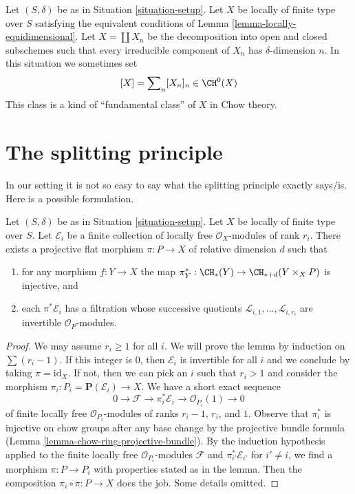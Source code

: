 \begin{remark}
\label{remark-fundamental-class}
Let $(S, \delta)$ be as in Situation \ref{situation-setup}.
Let $X$ be locally of finite type over $S$ satisfying the
equivalent conditions of Lemma \ref{lemma-locally-equidimensional}.
Let $X = \coprod X_n$ be the decomposition into open and closed
subschemes such that every irreducible component of $X_n$ has
$\delta$-dimension $n$. In this situation we sometimes set
$$
[X] = \sum\nolimits_n [X_n]_n \in \CH^0(X)
$$
This class is a kind of ``fundamental class'' of $X$ in Chow theory.
\end{remark}




\section{The splitting principle}
\label{section-splitting-principle}

\noindent
In our setting it is not so easy to say what the splitting principle
exactly says/is. Here is a possible formulation.

\begin{lemma}
\label{lemma-splitting-principle}
Let $(S, \delta)$ be as in Situation \ref{situation-setup}. Let $X$ be locally
of finite type over $S$. Let $\mathcal{E}_i$ be a finite collection of
locally free $\mathcal{O}_X$-modules of rank $r_i$. There exists a projective
flat morphism $\pi : P \to X$ of relative dimension $d$ such that
\begin{enumerate}
\item for any morphism $f : Y \to X$ the map
$\pi_Y^* : \CH_*(Y) \to \CH_{* + d}(Y \times_X P)$ is injective, and
\item each $\pi^*\mathcal{E}_i$ has a filtration
whose successive quotients $\mathcal{L}_{i, 1}, \ldots, \mathcal{L}_{i, r_i}$
are invertible ${\mathcal O}_P$-modules.
\end{enumerate}
\end{lemma}

\begin{proof}
We may assume $r_i \geq 1$ for all $i$. We will prove the lemma by induction
on $\sum (r_i - 1)$. If this integer is $0$, then $\mathcal{E}_i$
is invertible for all $i$ and we conclude by taking $\pi = \text{id}_X$.
If not, then we can pick an $i$ such that $r_i > 1$ and consider the
morphism $\pi_i : P_i = \mathbf{P}(\mathcal{E}_i) \to X$.
We have a short exact sequence
$$
0 \to \mathcal{F} \to \pi_i^*\mathcal{E}_i \to \mathcal{O}_{P_i}(1) \to 0
$$
of finite locally free $\mathcal{O}_{P_i}$-modules of ranks $r_i - 1$,
$r_i$, and $1$. Observe that $\pi_i^*$ is injective on chow groups
after any base change by the projective bundle formula
(Lemma \ref{lemma-chow-ring-projective-bundle}).
By the induction hypothesis applied to the finite locally free
$\mathcal{O}_{P_i}$-modules $\mathcal{F}$ and $\pi_{i'}^*\mathcal{E}_{i'}$
for $i' \not = i$, we find a morphism $\pi : P \to P_i$ with
properties stated as in the lemma. Then the composition
$\pi_i \circ \pi : P \to X$ does the job. Some details omitted.
\end{proof}

